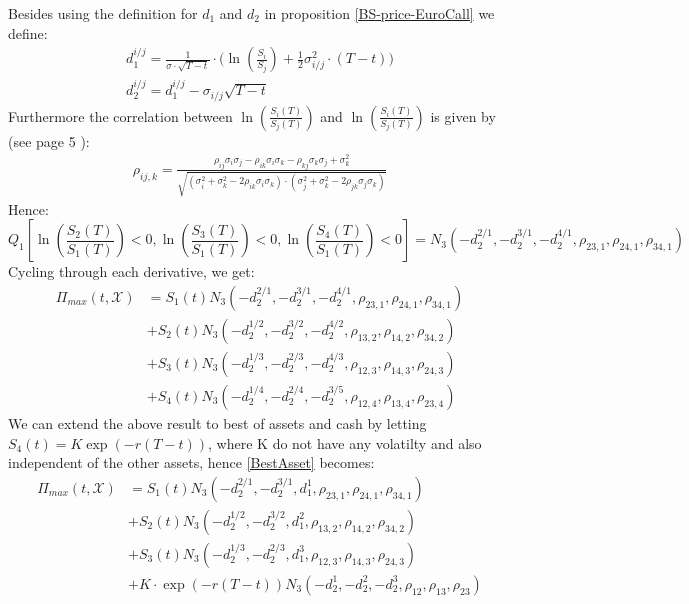 Besides using the definition for $d_1$ and $d_2$ in proposition \ref{BS-price-EuroCall} we define:
\begin{align}
d^{i/j}_1 =\frac{1}{\sigma\cdot \sqrt{T-t}} \cdot \bigg( \ln(\frac{S_i}{S_j}) + \frac{1}{2} \sigma_{i/j}^2 \cdot (T-t) \bigg)\\
d^{i/j}_2=d^{i/j}_1-\sigma_{i/j} \sqrt{T-t}
\end{align}
Furthermore the correlation between $\ln(\frac{S_i(T)}{S_j(T)})$ and $\ln(\frac{S_i(T)}{S_j(T)})$ is given by (see page 5 \parencite{Ouwehand2006}):
\begin{align}
\rho_{ij,k}= \frac{\rho_{ij}\sigma_i \sigma_j - \rho_{ik}\sigma_i \sigma_k - \rho_{kj}\sigma_k \sigma_j + \sigma_k^2}{\sqrt{(\sigma_i^2 + \sigma_k^2 - 2\rho_{ik}\sigma_i \sigma_k)\cdot(\sigma_j^2 + \sigma_k^2 - 2\rho_{jk}\sigma_j \sigma_k)}}
\end{align}
Hence:
$$Q_1[\ln(\frac{S_2(T)}{S_1(T)})<0, \ln(\frac{S_3(T)}{S_1(T)})<0, \ln(\frac{S_4(T)}{S_1(T)})<0]=N_3(-d_2^{2/1},-d_2^{3/1},-d_2^{4/1}, \rho_{23,1}, \rho_{24,1}, \rho_{34,1})$$
Cycling through each derivative, we get:
\begin{equation}\label{BestAsset}
\begin{split}
\Pi_{max}(t,\mathcal{X})&=S_1(t) N_3(-d_2^{2/1},-d_2^{3/1},-d_2^{4/1}, \rho_{23,1}, \rho_{24,1}, \rho_{34,1}) \\
&+S_2(t) N_3(-d_2^{1/2},-d_2^{3/2},-d_2^{4/2}, \rho_{13,2}, \rho_{14,2}, \rho_{34,2})\\
&+S_3(t) N_3(-d_2^{1/3},-d_2^{2/3},-d_2^{4/3}, \rho_{12,3}, \rho_{14,3}, \rho_{24,3}) \\
&+S_4(t) N_3(-d_2^{1/4},-d_2^{2/4},-d_2^{3/5}, \rho_{12,4}, \rho_{13,4}, \rho_{23,4})
\end{split}
\end{equation}
We can extend the above result to best of assets and cash by letting $S_4(t)=K\exp(-r(T-t))$, where K do not have any volatilty and also independent of the other assets, hence \eqref{BestAsset} becomes:
\begin{equation}\label{BestAssetOrCash}
\begin{split}
\Pi_{max}(t,\mathcal{X})&=S_1(t) N_3(-d_2^{2/1},-d_2^{3/1},d_1^{1}, \rho_{23,1}, \rho_{24,1}, \rho_{34,1}) \\
&+S_2(t) N_3(-d_2^{1/2},-d_2^{3/2},d_1^{2}, \rho_{13,2}, \rho_{14,2}, \rho_{34,2})\\
&+S_3(t) N_3(-d_2^{1/3},-d_2^{2/3},d_1^{3}, \rho_{12,3}, \rho_{14,3}, \rho_{24,3}) \\
&+K\cdot \exp(-r(T-t)) N_3(-d_2^1,-d_2^2,-d_2^3, \rho_{12}, \rho_{13}, \rho_{23})
\end{split}
\end{equation}

